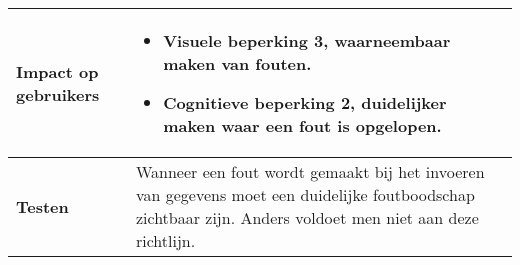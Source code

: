 \begin{table}[H]
\begin{tabular}{|l|p{12cm}|}
        \hline
        \textbf{Impact op gebruikers}         &  
        \begin{itemize}
            \item Visuele beperking 3, waarneembaar maken van fouten.
            \item Cognitieve beperking 2, duidelijker maken waar een fout is opgelopen.
        \end{itemize}                                                                                                                                                                                                                                                                                                     \\ 
        
        \hline
        \textbf{Testen}                       & Wanneer een fout wordt gemaakt bij het invoeren van gegevens moet een duidelijke foutboodschap zichtbaar zijn. Anders voldoet men niet aan deze richtlijn.                       \\
        \hline
    \end{tabular}
    
\end{table}
\newpage
